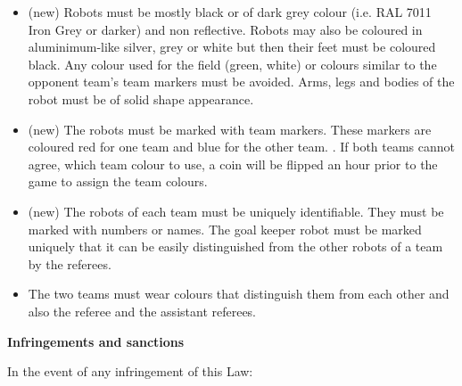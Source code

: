 \begin{itemize}
\item (new) Robots must be mostly black or of dark grey colour (i.e. RAL 7011 Iron Grey or darker) and non reflective. Robots may also be coloured in aluminimum-like silver, grey or white but then their feet must be coloured black. Any colour used for the field (green, white) or colours similar to the opponent team's team markers must be avoided. Arms, legs and bodies of the robot must be of solid shape appearance.
\item (new) The robots must be marked with team markers.
 These markers are coloured red for one team and blue for the other team.   . If both teams cannot agree, which team colour to use, a coin will be flipped an hour prior to the game to assign the team colours.
\item (new) The robots of each team must be uniquely identifiable. They must be marked with numbers or names. The goal keeper robot must be marked uniquely that it can be easily distinguished from the other robots of a team by the referees. 
\item The two teams must wear colours that distinguish them from each other and also the referee and the assistant referees.
\end{itemize}

\bigskip

{\bfseries Infringements and sanctions}

\headlinebox

In the event of any infringement of this Law:

